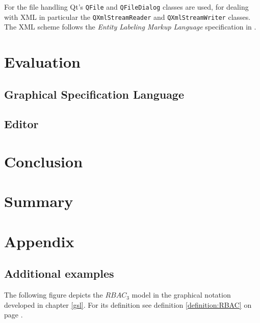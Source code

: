 \documentclass[twoside, openright, 12pt]{book}
\begin{document}
For the file handling Qt's \texttt{QFile} and \texttt{QFileDialog} classes are used, for dealing with XML in particular the \texttt{QXmlStreamReader} and \texttt{QXmlStreamWriter} classes.
The XML scheme follows the \textit{Entity Labeling Markup Language} specification in \cite[appendix C.2, p.~196]{Amthor18}.






\cleardoublepage
\chapter{Evaluation}
\label{evaluation}

\section{Graphical Specification Language}
\label{evaluation_gsl}

\section{Editor}
\label{evaluation_editor}


\cleardoublepage
\chapter{Conclusion}
\label{conclusion}
\blindtext



\cleardoublepage
\chapter{Summary}
\label{summary}
\blindtext



\cleardoublepage
{}
\renewcommand{\thesection}{\Alph{section}}
\chapter*{Appendix}
\label{appendix}
\section{Additional examples}
The following figure depicts the $RBAC_3$ model in the graphical notation developed in chapter \ref{gsl}.
For its definition see definition \ref{definition:RBAC} on page \pageref{definition:RBAC}.
\end{document}
